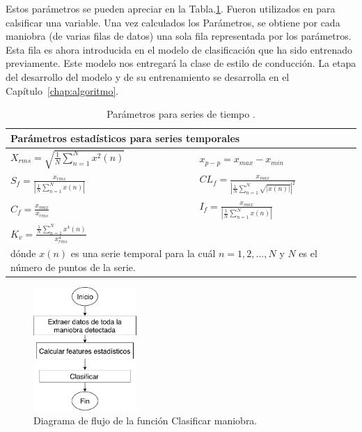 Estos parámetros se pueden apreciar en la Tabla.\ref{diag:features}. Fueron utilizados en \cite{Feature_extraction} para calsificar  una variable. Una vez calculados los Parámetros, se obtiene por cada maniobra (de varias filas de datos) una sola fila representada por los parámetros. Esta fila es ahora introducida en el modelo de clasificación que ha sido entrenado previamente. Este modelo nos entregará la clase de estilo de conducción. La etapa del desarrollo del modelo y de su entrenamiento se desarrolla en el Capítulo~\ref{chap:algoritmo}.




\bgroup
\def\arraystretch{1.5}%
\begin{table}[htbp!]
\centering
\caption[Parámetros para series de tiempo]{Parámetros para series de tiempo \cite{Feature_extraction}.}
\begin{tabular}{p{}l}
\toprule
\multicolumn{2}{l}{Parámetros estadísticos para series temporales} \\ \midrule
$X_{rms}= \sqrt{\frac{1}{N}\sum_{n=1}^{N} x^{2}(n)} $  &
$ x_{p-p}=x_{max}-x_{min} $  \\
$ S_f=\displaystyle\frac{x_{rms}}{\left|\frac{1}{N}\sum_{n=1}^{N} x(n)\right|} $  &
$ CL_f=\displaystyle\frac{x_{max}}{\left|\frac{1}{N}\sum_{n=1}^{N} \sqrt{|x(n)|}\right|^{2}} $  \\
$ C_f=\displaystyle\frac{x_{max}}{x_{rms}} $  &
$ I_f=\displaystyle\frac{x_{max}}{\left|\frac{1}{N}\sum_{n=1}^{N} x(n)\right|} $ \\
$ K_v=\displaystyle\frac{\frac{1}{N}\sum_{n=1}^{N} x^{4}(n)}{x_{rms}^4} $ \\
\multicolumn{2}{p{\textwidth}}{dónde  $x(n)$ es una serie temporal para la cuál  $n = 1,2,...,N$ y $N$ es el número de puntos de la serie.} \\\bottomrule
\end{tabular}
\label{diag:features}
\end{table}
\egroup


\begin{figure}[hbt!]
\centering
\includegraphics[width=0.35\textwidth]{Flujo_servidor_clasificar.pdf}
\caption{Diagrama de flujo de la función Clasificar maniobra.}
\label{fig:Flujo_servidor_clasificar}
\end{figure}


